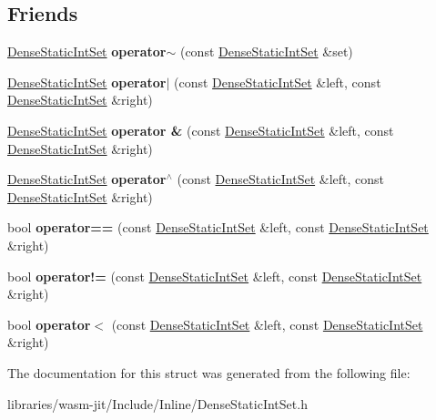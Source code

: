 \subsection*{Friends}
\begin{DoxyCompactItemize}
\item 
\mbox{\label{struct_dense_static_int_set_a41dcb521a6896c21298ebaf552ac69b6}} 
\mbox{\hyperlink{struct_dense_static_int_set}{Dense\+Static\+Int\+Set}} {\bfseries operator$\sim$} (const \mbox{\hyperlink{struct_dense_static_int_set}{Dense\+Static\+Int\+Set}} \&set)
\item 
\mbox{\label{struct_dense_static_int_set_ae6ba71df8d624583648da7a3ab000d2c}} 
\mbox{\hyperlink{struct_dense_static_int_set}{Dense\+Static\+Int\+Set}} {\bfseries operator$\vert$} (const \mbox{\hyperlink{struct_dense_static_int_set}{Dense\+Static\+Int\+Set}} \&left, const \mbox{\hyperlink{struct_dense_static_int_set}{Dense\+Static\+Int\+Set}} \&right)
\item 
\mbox{\label{struct_dense_static_int_set_a0c80de86c04e457028099bcc3bc57a26}} 
\mbox{\hyperlink{struct_dense_static_int_set}{Dense\+Static\+Int\+Set}} {\bfseries operator \&} (const \mbox{\hyperlink{struct_dense_static_int_set}{Dense\+Static\+Int\+Set}} \&left, const \mbox{\hyperlink{struct_dense_static_int_set}{Dense\+Static\+Int\+Set}} \&right)
\item 
\mbox{\label{struct_dense_static_int_set_a24947a9e703b2cc732e85e1d6fc28d55}} 
\mbox{\hyperlink{struct_dense_static_int_set}{Dense\+Static\+Int\+Set}} {\bfseries operator$^\wedge$} (const \mbox{\hyperlink{struct_dense_static_int_set}{Dense\+Static\+Int\+Set}} \&left, const \mbox{\hyperlink{struct_dense_static_int_set}{Dense\+Static\+Int\+Set}} \&right)
\item 
\mbox{\label{struct_dense_static_int_set_ab2db17e4549c86ced6a0a3f080fccac5}} 
bool {\bfseries operator==} (const \mbox{\hyperlink{struct_dense_static_int_set}{Dense\+Static\+Int\+Set}} \&left, const \mbox{\hyperlink{struct_dense_static_int_set}{Dense\+Static\+Int\+Set}} \&right)
\item 
\mbox{\label{struct_dense_static_int_set_ad0d4b71d9b5bc1641774db61be4f38d2}} 
bool {\bfseries operator!=} (const \mbox{\hyperlink{struct_dense_static_int_set}{Dense\+Static\+Int\+Set}} \&left, const \mbox{\hyperlink{struct_dense_static_int_set}{Dense\+Static\+Int\+Set}} \&right)
\item 
\mbox{\label{struct_dense_static_int_set_a255507e0258ee9e25729713d57598ca5}} 
bool {\bfseries operator$<$} (const \mbox{\hyperlink{struct_dense_static_int_set}{Dense\+Static\+Int\+Set}} \&left, const \mbox{\hyperlink{struct_dense_static_int_set}{Dense\+Static\+Int\+Set}} \&right)
\end{DoxyCompactItemize}


The documentation for this struct was generated from the following file\+:\begin{DoxyCompactItemize}
\item 
libraries/wasm-\/jit/\+Include/\+Inline/Dense\+Static\+Int\+Set.\+h\end{DoxyCompactItemize}
